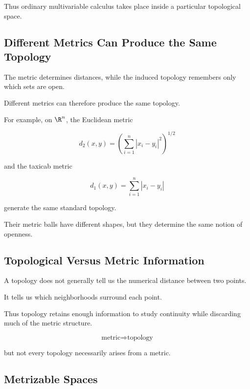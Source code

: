 Thus ordinary multivariable calculus takes place inside a particular
topological space.

\subsection{Different Metrics Can Produce the Same Topology}
\label{subsec:different-metrics-same-topology}

The metric determines distances, while the induced topology remembers only
which sets are open.

Different metrics can therefore produce the same topology.

For example, on \(\R^n\), the Euclidean metric

\[
d_2(x,y)
=
\left(
\sum_{i=1}^{n}|x_i-y_i|^2
\right)^{1/2}
\]

and the taxicab metric

\[
d_1(x,y)
=
\sum_{i=1}^{n}|x_i-y_i|
\]

generate the same standard topology.

Their metric balls have different shapes, but they determine the same
notion of openness.

\subsection{Topological Versus Metric Information}
\label{subsec:topological-vs-metric-information}

A topology does not generally tell us the numerical distance between two
points.

It tells us which neighborhoods surround each point.

Thus topology retains enough information to study continuity while
discarding much of the metric structure.

\[
\boxed{
\text{metric}
\Longrightarrow
\text{topology}
}
\]

but not every topology necessarily arises from a metric.

\subsection{Metrizable Spaces}
\label{subsec:metrizable-spaces}

